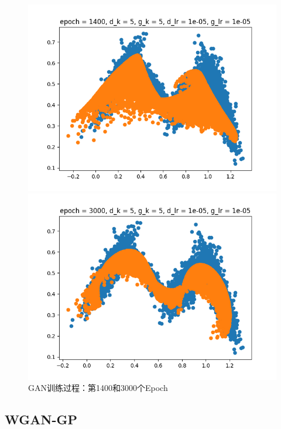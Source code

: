 \documentclass{article}
\begin{document}
\begin{figure}[H]
    \begin{minipage}[H]{0.5\linewidth}
        \centering
        \includegraphics[width=\textwidth]{figures/WGAN_1400.png}
    \end{minipage}
    \begin{minipage}[H]{0.5\linewidth}
        \centering
        \includegraphics[width=\textwidth]{figures/WGAN_3000.png}
    \end{minipage}
    \caption{GAN训练过程：第1400和3000个Epoch}
\end{figure}

\subsection{WGAN-GP}
\end{document}
